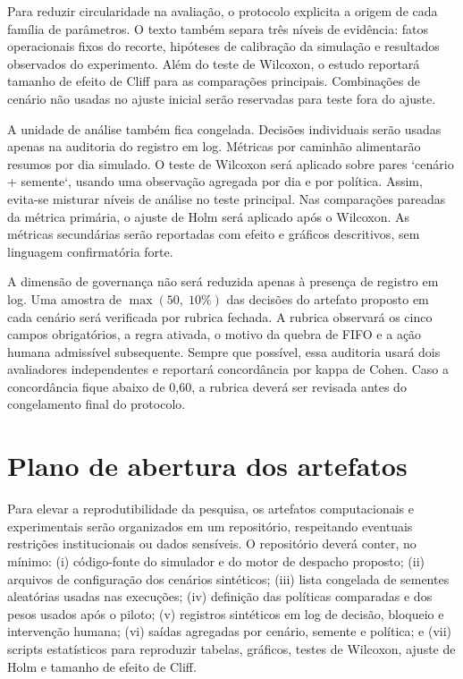 \documentclass[
  12pt,
  oneside,
  a4paper,
  sumario=tradicional,
  brazil
]{abntex2}
\begin{document}
Para reduzir circularidade na avalia\c{c}\~ao, o protocolo explicita a origem de cada fam\'ilia de par\^ametros. O texto tamb\'em separa tr\^es n\'iveis de evid\^encia: fatos operacionais fixos do recorte, hip\'oteses de calibra\c{c}\~ao da simula\c{c}\~ao e resultados observados do experimento. Al\'em do teste de Wilcoxon, o estudo reportar\'a tamanho de efeito de Cliff para as compara\c{c}\~oes principais. Combina\c{c}\~oes de cen\'ario n\~ao usadas no ajuste inicial ser\~ao reservadas para teste fora do ajuste.

A unidade de an\'alise tamb\'em fica congelada. Decis\~oes individuais ser\~ao usadas apenas na auditoria do registro em log. M\'etricas por caminh\~ao alimentar\~ao resumos por dia simulado. O teste de Wilcoxon ser\'a aplicado sobre pares `cen\'ario + semente`, usando uma observa\c{c}\~ao agregada por dia e por pol\'itica. Assim, evita-se misturar n\'iveis de an\'alise no teste principal. Nas compara\c{c}\~oes pareadas da m\'etrica prim\'aria, o ajuste de Holm ser\'a aplicado ap\'os o Wilcoxon. As m\'etricas secund\'arias ser\~ao reportadas com efeito e gr\'aficos descritivos, sem linguagem confirmat\'oria forte.

A dimens\~ao de governan\c{c}a n\~ao ser\'a reduzida apenas \`a presen\c{c}a de registro em log. Uma amostra de $\max(50,\;10\%)$ das decis\~oes do artefato proposto em cada cen\'ario ser\'a verificada por rubrica fechada. A rubrica observar\'a os cinco campos obrigat\'orios, a regra ativada, o motivo da quebra de FIFO e a a\c{c}\~ao humana admiss\'ivel subsequente. Sempre que poss\'ivel, essa auditoria usar\'a dois avaliadores independentes e reportar\'a concord\^ancia por kappa de Cohen. Caso a concord\^ancia fique abaixo de 0,60, a rubrica dever\'a ser revisada antes do congelamento final do protocolo.

\section{Plano de abertura dos artefatos}
Para elevar a reprodutibilidade da pesquisa, os artefatos computacionais e experimentais ser\~ao organizados em um reposit\'orio, respeitando eventuais restri\c{c}\~oes institucionais ou dados sens\'iveis. O reposit\'orio dever\'a conter, no m\'inimo: (i) c\'odigo-fonte do simulador e do motor de despacho proposto; (ii) arquivos de configura\c{c}\~ao dos cen\'arios sint\'eticos; (iii) lista congelada de sementes aleat\'orias usadas nas execu\c{c}\~oes; (iv) defini\c{c}\~ao das pol\'iticas comparadas e dos pesos usados ap\'os o piloto; (v) registros sint\'eticos em log de decis\~ao, bloqueio e interven\c{c}\~ao humana; (vi) sa\'idas agregadas por cen\'ario, semente e pol\'itica; e (vii) scripts estat\'isticos para reproduzir tabelas, gr\'aficos, testes de Wilcoxon, ajuste de Holm e tamanho de efeito de Cliff.
\end{document}
